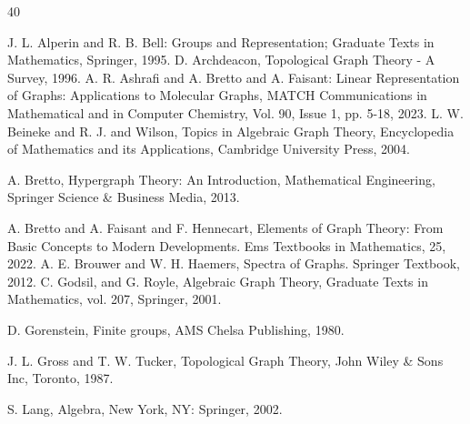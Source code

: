 \documentclass[preprint,12pt,authoryear]{elsarticle}
\theoremstyle{definition}
\begin{document}
\begin{thebibliography}{40}

J.  L. Alperin and R.  B. Bell: Groups and Representation; Graduate Texts in Mathematics, Springer, 1995.
D. Archdeacon, Topological Graph Theory - A Survey,  1996.
A. R. Ashrafi and  A. Bretto and  A. Faisant: Linear Representation of Graphs: Applications to Molecular Graphs, MATCH Communications in Mathematical and in Computer Chemistry, Vol. 90, Issue 1, pp. 5-18, 2023.
L. W. Beineke  and R. J. and Wilson, Topics in Algebraic Graph Theory, Encyclopedia of Mathematics and its Applications, Cambridge University Press, 2004.


 A.  Bretto,   Hypergraph Theory: An Introduction,   
Mathematical Engineering, Springer Science \& Business Media, 2013.
 
 A.  Bretto and  A. Faisant  and F.     Hennecart, 
Elements of Graph Theory: From Basic Concepts to Modern Developments.
Ems Textbooks in Mathematics, 25, 2022.
A. E. Brouwer and W. H. Haemers, Spectra of Graphs. Springer Textbook, 2012.
C. Godsil, and G. Royle, Algebraic Graph Theory, Graduate Texts in Mathematics, vol. 207, Springer,  2001.

D. Gorenstein, Finite groups, AMS Chelsa Publishing, 1980. 
 
 
J. L. Gross and T. W. Tucker, Topological Graph Theory, John Wiley \& Sons Inc, Toronto, 1987. 


 
 
S. Lang,  Algebra,   New York, NY: Springer, 2002.


\end{thebibliography}
\end{document}
